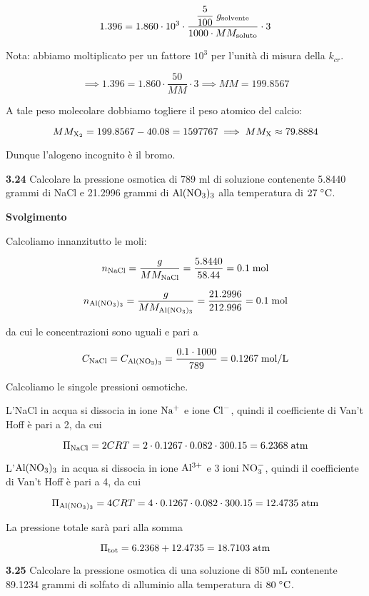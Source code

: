 $$1.396=1.860 \cdot 10^3 \cdot \frac{\displaystyle \frac{5}{100}\;g_{\rm solvente}}{1000 \cdot MM_{\rm soluto}} \cdot 3$$

Nota: abbiamo moltiplicato per un fattore $10^3$ per l'unità di misura della $k_{cr}$.

$$\implies
1.396=1.860 \cdot \frac{50}{MM} \cdot 3
\implies
MM=199.8567$$

A tale peso molecolare dobbiamo togliere il peso atomico del calcio:

$$MM_{\rm X_2}=199.8567-40.08=1597767
\implies
MM_{\rm X} \approx 79.8884$$

Dunque l'alogeno incognito è il bromo.

\vspace{0.2cm}\textbf{3.24} Calcolare la pressione osmotica di 789 ml di soluzione contenente 5.8440 grammi di NaCl e 21.2996 grammi di $\rm Al(NO_3)_3$ alla temperatura di $27 \; \rm ^{\circ}C$.

\vspace{0.2cm}\large\textbf{Svolgimento}\normalsize

\vspace{0.2cm}Calcoliamo innanzitutto le moli:

$$n_{\rm NaCl}=\frac{g}{MM_{\rm NaCl}}
=\frac{5.8440}{58.44}=0.1 \; \rm mol$$

$$n_{\rm Al(NO_3)_3}=\frac{g}{MM_{\rm Al(NO_3)_3}}
=\frac{21.2996}{212.996}=0.1 \; \rm mol$$

da cui le concentrazioni sono uguali e pari a

$$C_{\rm NaCl}=C_{\rm Al(NO_3)_3}=\frac{0.1 \cdot 1000}{789}
=0.1267 \; \rm mol/L$$

Calcoliamo le singole pressioni osmotiche.

L'NaCl in acqua si dissocia in ione $\rm Na^+$ e ione $\rm Cl^-$, quindi il coefficiente di Van't Hoff è pari a 2, da cui

$$\Pi_{\rm NaCl}=2CRT=2 \cdot 0.1267 \cdot 0.082 \cdot 300.15=6.2368 \; \rm atm$$

L'$\rm Al(NO_3)_3$ in acqua si dissocia in ione $\rm Al^{3+}$ e 3 ioni $\rm NO_3^-$, quindi il coefficiente di Van't Hoff è pari a 4, da cui

$$\Pi_{\rm Al(NO_3)_3}=4CRT=4 \cdot 0.1267 \cdot 0.082 \cdot 300.15=12.4735 \; \rm atm$$

La pressione totale sarà pari alla somma

$$\Pi_{\rm tot}=6.2368 + 12.4735=18.7103 \; \rm atm$$

\vspace{0.2cm}\textbf{3.25} Calcolare la pressione osmotica di una soluzione di 850 mL contenente 89.1234 grammi di solfato di alluminio alla temperatura di $80 \; ^{\circ} \rm C$.

